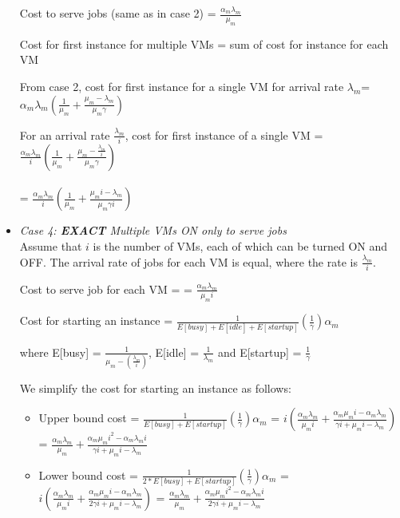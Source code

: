 \documentclass[letter,11pt]{article}
\begin{document}
\begin{itemize}
Cost to serve jobs (same as in case 2)  = $\frac{\alpha_m \lambda_m}{\mu_m}$

Cost for first instance for multiple VMs = sum of cost for instance for each VM

From case 2, cost for first instance for a single VM for arrival rate $\lambda_m$= $\alpha_m \lambda_m(\frac{1}{\mu_m} + \frac{\mu_m - \lambda_m}{\mu_m \gamma}) $

For an arrival rate $\frac{\lambda_m}{i}$, cost for first instance of a single VM = $\frac{\alpha_m \lambda_m}{i} (\frac{1}{\mu_m} + \frac{\mu_m - \frac{\lambda_m}{i}}{\mu_m \gamma})$ \\ \\
 = $\frac{\alpha_m \lambda_m}{i} (\frac{1}{\mu_m} + \frac{\mu_m i - \lambda_m}{\mu_m \gamma i})$

\item \textit{Case 4: \textbf{EXACT} Multiple VMs ON only to serve jobs} \\
Assume that $i$ is the number of VMs, each of which can be turned ON and OFF. The arrival rate of jobs for each VM is equal, where the rate is $\frac{\lambda_m}{i}$.

Cost to serve job for each VM  = = $\frac{\alpha_m \lambda_m}{\mu_m i}$

Cost for starting an instance = $\frac{1}{E[busy] + E[idle] + E[startup]}(\frac{1}{\gamma})\alpha_m$ 

where E[busy] = $\frac{1}{\mu_m - (\frac{\lambda_m}{i})}$, E[idle] = $\frac{1}{\lambda_m}$ and E[startup] = $\frac{1}{\gamma}$

We simplify the cost for starting an instance as follows: 
\begin{itemize}
\item Upper bound cost = $\frac{1}{E[busy] + E[startup]}(\frac{1}{\gamma})\alpha_m$ = $i(\frac{\alpha_m \lambda_m}{\mu_m i} + \frac{\alpha_m \mu_m i - \alpha_m \lambda_m}{\gamma i + \mu_m i - \lambda_m})$ = $\frac{\alpha_m \lambda_m}{\mu_m} + \frac{\alpha_m \mu_m i^2 - \alpha_m \lambda_m i}{\gamma i + \mu_m i - \lambda_m}$
\item Lower bound cost = $\frac{1}{2 * E[busy] + E[startup]}(\frac{1}{\gamma})\alpha_m$ = $i(\frac{\alpha_m \lambda_m}{\mu_m i} + \frac{\alpha_m \mu_m i - \alpha_m \lambda_m}{2 \gamma i + \mu_m i - \lambda_m})$ = $\frac{\alpha_m \lambda_m}{\mu_m} + \frac{\alpha_m \mu_m i^2 - \alpha_m \lambda_m i}{2 \gamma i + \mu_m i - \lambda_m}$
\end{itemize}


\end{itemize}
\end{document}
